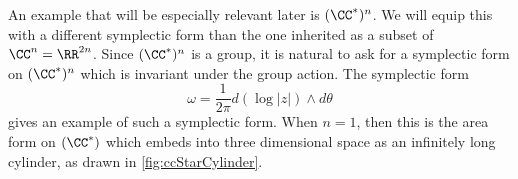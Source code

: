 
    An example that will be especially relevant later is $(\CC^*)^n$.
    We will equip this with a different symplectic form than the one inherited as a subset of $\CC^n=\RR^{2n}$.
    Since $(\CC^*)^n$ is a group, it is natural to ask for a symplectic form on $(\CC^*)^n$ which is invariant under the group action. 
    The symplectic form 
    \[
        \omega=\frac{1}{2\pi} d(\log |z|)\wedge d\theta
    \]
    gives an example of such a symplectic form.
When $n=1$, then this is the area form on $(\CC^*)$ which embeds into three dimensional space as an infinitely long cylinder, as drawn in \cref{fig:ccStarCylinder}.



